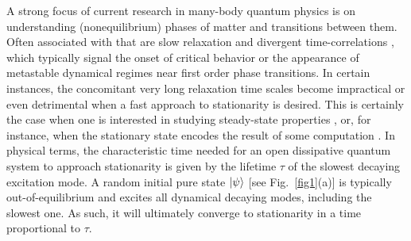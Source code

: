 \documentclass[prl,floatfix,twocolumn,superscriptaddress,showpacs,preprintnumbers,longbibliography,nofootinbib]{revtex4-1}
\begin{document}
 A strong focus of current research in many-body quantum physics is on understanding (nonequilibrium) phases of matter and transitions between them. Often associated with that are slow relaxation and divergent time-correlations \cite{polkovnikov2011,nandkishore2015,altman2015,turner2018,abanin2019,roy2020,pancotti2020}, which typically signal the onset of critical behavior \cite{hinrichsen2000,dagvadorj2015,carollo2019,gillman2019,jo2019,puel2021} or the appearance of metastable dynamical regimes \cite{bovier2002,macieszczak2016} near first order phase transitions. In certain instances, the concomitant very long relaxation time scales become impractical or even detrimental when a fast approach to stationarity is desired. This is certainly the case when one is interested in studying steady-state properties \cite{lin2013}, or, for instance, when the stationary state encodes the result of some computation \cite{verstraete2009,lewenstein2020}. In physical terms, the characteristic time needed for an open dissipative quantum system to approach stationarity is given by the lifetime $\tau$ of the slowest decaying excitation mode. A random initial pure state $\ket{\psi}$ [see Fig.~\ref{fig1}(a)] is typically out-of-equilibrium and excites all dynamical decaying modes, including the slowest one. As such, it will ultimately converge to stationarity in a time proportional to $\tau$. 
\end{document}
